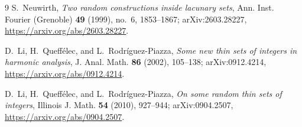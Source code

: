 \documentclass[11pt]{amsart}
\newcommand{\1}{\mathbf 1}
\theoremstyle{definition}
\theoremstyle{remark}
\begin{document}
\begin{thebibliography}{9}
S.~Neuwirth,
\emph{Two random constructions inside lacunary sets},
Ann. Inst. Fourier (Grenoble) \textbf{49} (1999), no.~6, 1853--1867;
arXiv:2603.28227,
\url{https://arxiv.org/abs/2603.28227}.

D.~Li, H.~Queff\'elec, and L.~Rodr\'iguez-Piazza,
\emph{Some new thin sets of integers in harmonic analysis},
J. Anal. Math. \textbf{86} (2002), 105--138;
arXiv:0912.4214,
\url{https://arxiv.org/abs/0912.4214}.

D.~Li, H.~Queff\'elec, and L.~Rodr\'iguez-Piazza,
\emph{On some random thin sets of integers},
Illinois J. Math. \textbf{54} (2010), 927--944;
arXiv:0904.2507,
\url{https://arxiv.org/abs/0904.2507}.
\end{thebibliography}
\end{document}
